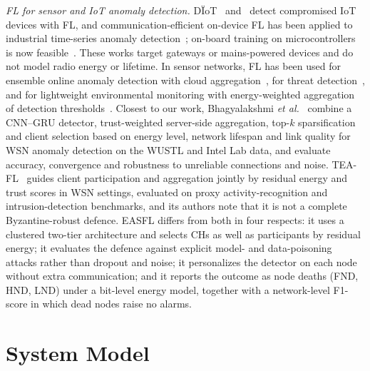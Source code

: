 \documentclass[journal]{IEEEtran}
\begin{document}
\textit{FL for sensor and IoT anomaly detection.} D\"IoT~\cite{nguyen2019diot} and~\cite{mothukuri2022} detect compromised IoT devices with FL, and communication-efficient on-device FL has been applied to industrial time-series anomaly detection~\cite{liu2021jiot}; on-board training on microcontrollers is now feasible~\cite{ficco2024}. These works target gateways or mains-powered devices and do not model radio energy or lifetime. In sensor networks, FL has been used for ensemble online anomaly detection with cloud aggregation~\cite{gayathri2024}, for threat detection~\cite{gupta2025}, and for lightweight environmental monitoring with energy-weighted aggregation of detection thresholds~\cite{yan2024lsens}. Closest to our work, Bhagyalakshmi \textit{et al.}~\cite{bhagyalakshmi2026} combine a CNN--GRU detector, trust-weighted server-side aggregation, top-$k$ sparsification and client selection based on energy level, network lifespan and link quality for WSN anomaly detection on the WUSTL and Intel Lab data, and evaluate accuracy, convergence and robustness to unreliable connections and noise. TEA-FL~\cite{reis2026} guides client participation and aggregation jointly by residual energy and trust scores in WSN settings, evaluated on proxy activity-recognition and intrusion-detection benchmarks, and its authors note that it is not a complete Byzantine-robust defence. EASFL differs from both in four respects: it uses a clustered two-tier architecture and selects CHs as well as participants by residual energy; it evaluates the defence against explicit model- and data-poisoning attacks rather than dropout and noise; it personalizes the detector on each node without extra communication; and it reports the outcome as node deaths (FND, HND, LND) under a bit-level energy model, together with a network-level F1-score in which dead nodes raise no alarms.

\section{System Model}\label{sec:model}
\end{document}
